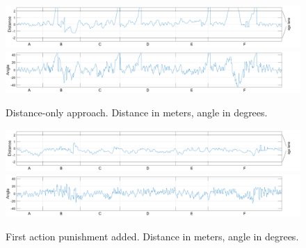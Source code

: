 \begin{figure}[!t]
\centering
\includegraphics[scale=0.265]{../plots/dist_eval_log_distance_serpentine_06speed}
\vspace{0.5em}
\includegraphics[scale=0.265]{../plots/ang_eval_log_distance_serpentine_06speed}
\vspace{-2.25em}
\caption{Distance-only approach. Distance in meters, angle in degrees.}
\label{distance06}
\vspace{1em}
\includegraphics[scale=0.265]{../plots/dist_eval_log_dumb_actions_serpentine_06speed}
\vspace{0.5em}
\includegraphics[scale=0.265]{../plots/ang_eval_log_dumb_actions_serpentine_06speed}
\vspace{-2.25em}\label{fig_first_case}
\caption{First action punishment added. Distance in meters, angle in degrees.}
\label{dumbactions06}
\end{figure}

